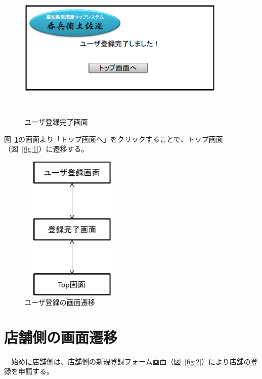 \documentclass[a4j,titlepage]{jarticle}
\begin{document}
\begin {figure}[!htbp]
    \begin{center}
    \includegraphics [height=7cm, width=10cm]{23.eps}
    \caption {ユーザ登録完了画面}
    \label {fig:23}
    \end{center}
\end {figure}



図~\ref{fig:23}の画面より「トップ画面へ」をクリックすることで、トップ画面（図~\ref{fig:1}）に遷移する。



\begin {figure}[!htbp]
    \begin{center}
    \includegraphics [height=7cm, width=5cm]{24.eps}
    \caption {ユーザ登録の画面遷移}
    \label {fig:24}
    \end{center}
\end {figure}
\clearpage
\section{店舗側の画面遷移}


　始めに店舗側は、店舗側の新規登録フォーム画面（図~\ref{fig:2}）により店舗の登録を申請する。
\end{document}

